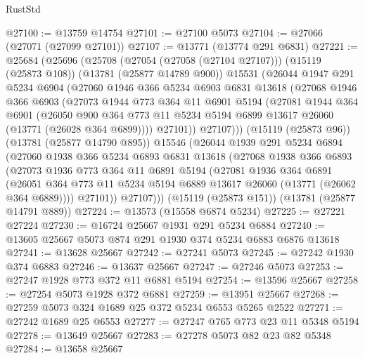 \begin{lexlean}{RustStd}
\begin{coremodule}
@27100 := @13759 @14754
@27101 := @27100 @5073
@27104 := @27066 (@27071 (@27099 @27101))
@27107 := @13771 (@13774 @291 @6831)
@27221 := @25684
    (@25696
      (@25708
        (@27054 (@27058 (@27104 @27107)))
        (@15119 (@25873 @108))
        (@13781 (@25877 @14789 @900))
        @15531
        (@26044
          @1947
          @291
          @5234
          @6904
          (@27060
            @1946
            @366
            @5234
            @6903
            @6831
            @13618
            (@27068
              @1946
              @366
              @6903
              (@27073
                @1944
                @773
                @364
                @11
                @6901
                @5194
                (@27081
                  @1944
                  @364
                  @6901
                  (@26050
                    @900
                    @364
                    @773
                    @11
                    @5234
                    @5194
                    @6899
                    @13617
                    @26060
                    (@13771 (@26028 @364 @6899))))
                @27101))
            @27107)))
      (@15119 (@25873 @96))
      (@13781 (@25877 @14790 @895))
      @15546
      (@26044
        @1939
        @291
        @5234
        @6894
        (@27060
          @1938
          @366
          @5234
          @6893
          @6831
          @13618
          (@27068
            @1938
            @366
            @6893
            (@27073
              @1936
              @773
              @364
              @11
              @6891
              @5194
              (@27081
                @1936
                @364
                @6891
                (@26051 @364 @773 @11 @5234 @5194 @6889 @13617 @26060 (@13771 (@26062 @364 @6889))))
              @27101))
          @27107)))
    (@15119 (@25873 @151))
    (@13781 (@25877 @14791 @889))
@27224 := @13573 (@15558 @6874 @5234)
@27225 := @27221 @27224
@27230 := @16724 @25667 @1931 @291 @5234 @6884
@27240 := @13605 @25667 @5073 @874 @291 @1930 @374 @5234 @6883 @6876 @13618
@27241 := @13628 @25667
@27242 := @27241 @5073
@27245 := @27242 @1930 @374 @6883
@27246 := @13637 @25667
@27247 := @27246 @5073
@27253 := @27247 @1928 @773 @372 @11 @6881 @5194
@27254 := @13596 @25667
@27258 := @27254 @5073 @1928 @372 @6881
@27259 := @13951 @25667
@27268 := @27259 @5073 @324 @1689 @25 @372 @5234 @6553 @5265 @2522
@27271 := @27242 @1689 @25 @6553
@27277 := @27247 @765 @773 @23 @11 @5348 @5194
@27278 := @13649 @25667
@27283 := @27278 @5073 @82 @23 @82 @5348
@27284 := @13658 @25667

\end{coremodule}
\end{lexlean}
